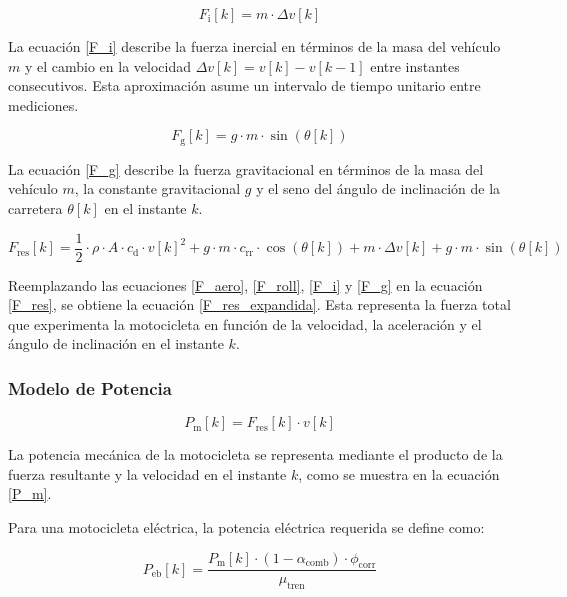 \begin{equation} 
    F_{\mathrm{i}}[k] = m \cdot \Delta v[k]
    \label{F_i}
\end{equation}

La ecuación \eqref{F_i} describe la fuerza inercial en términos de la masa del vehículo $m$ y el cambio en la velocidad $\Delta v[k] = v[k] - v[k-1]$ entre instantes consecutivos. Esta aproximación asume un intervalo de tiempo unitario entre mediciones.

\begin{equation} 
    F_{\mathrm{g}}[k] = g \cdot m \cdot \sin(\theta[k])
    \label{F_g}
\end{equation}

La ecuación \eqref{F_g} describe la fuerza gravitacional en términos de la masa del vehículo $m$, la constante gravitacional $g$ y el seno del ángulo de inclinación de la carretera $\theta[k]$ en el instante $k$.

\begin{equation} 
    F_{\mathrm{res}}[k] = \frac{1}{2} \cdot \rho \cdot A \cdot c_{\mathrm{d}} \cdot v[k]^2 + g \cdot m \cdot c_{\mathrm{rr}} \cdot \cos(\theta[k]) + m \cdot \Delta v[k] + g \cdot m \cdot \sin(\theta[k])
    \label{F_res_expandida}
\end{equation}

Reemplazando las ecuaciones \eqref{F_aero}, \eqref{F_roll}, \eqref{F_i} y \eqref{F_g} en la ecuación \eqref{F_res}, se obtiene la ecuación \eqref{F_res_expandida}. Esta representa la fuerza total que experimenta la motocicleta en función de la velocidad, la aceleración y el ángulo de inclinación en el instante $k$.

\subsubsection{Modelo de Potencia}

\begin{equation} 
    P_{\mathrm{m}}[k] = F_{\mathrm{res}}[k] \cdot v[k]
    \label{P_m}
\end{equation}

La potencia mecánica de la motocicleta se representa mediante el producto de la fuerza resultante y la velocidad en el instante $k$, como se muestra en la ecuación \eqref{P_m}.

Para una motocicleta eléctrica, la potencia eléctrica requerida se define como:

\begin{equation} 
    P_{\mathrm{eb}}[k] = \frac{P_{\mathrm{m}}[k] \cdot (1 - \alpha_{\mathrm{comb}}) \cdot \phi_{\mathrm{corr}}}{\mu_{\mathrm{tren}}}
    \label{P_eb}
\end{equation}

